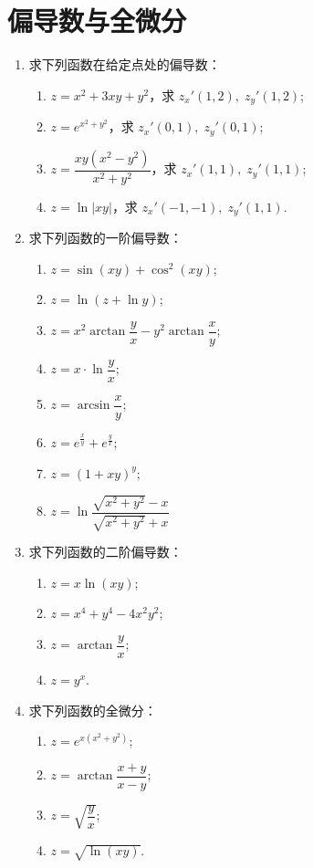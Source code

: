 \section{偏导数与全微分}

\begin{enumerate}\setlength{\itemsep}{7pt}
    \item 求下列函数在给定点处的偏导数：
    \begin{enumerate}[(1)]\setlength{\itemsep}{5pt}\setlength{\topsep}{15pt}
        \item $z=x^2+3xy+y^2$，求 $z_x'(1, 2),\;z_y'(1, 2)$;
        \item $z=e^{x^2+y^2}$，求 $z_x'(0, 1),\;z_y'(0, 1)$;
        \item $z=\dfrac{xy(x^2-y^2)}{x^2+y^2}$，求 $z_x'(1, 1),\;z_y'(1, 1)$;
        \item $z=\ln|xy|$，求 $z_x'(-1, -1),\;z_y'(1, 1)$.
    \end{enumerate}

    \item 求下列函数的一阶偏导数：
    \begin{enumerate}[(1)]\setlength{\itemsep}{5pt}\setlength{\topsep}{15pt}
        \item $z=\sin(xy)+\cos^2(xy)$;
        \item $z=\ln(z+\ln y)$;
        \item $z=x^2\arctan\dfrac{y}{x}-y^2\arctan\dfrac{x}{y}$;
        \item $z=x\cdot\ln\dfrac{y}{x}$;
        \item $z=\arcsin\dfrac{x}{y}$;
        \item $z=e^{\frac{x}{y}}+e^{\frac{y}{x}}$;
        \item $z=(1+xy)^{y}$;
        \item $z=\ln\dfrac{\sqrt{x^2+y^2}-x}{\sqrt{x^2+y^2}+x}$
    \end{enumerate}

    \item 求下列函数的二阶偏导数：
    \begin{enumerate}[(1)]\setlength{\itemsep}{5pt}\setlength{\topsep}{15pt}
        \item $z=x\ln(xy)$;
        \item $z=x^4+y^4-4x^2y^2$;
        \item $z=\arctan\dfrac{y}{x}$;
        \item $z=y^x$.
    \end{enumerate}

    \item 求下列函数的全微分：
    \begin{enumerate}[(1)]\setlength{\itemsep}{5pt}\setlength{\topsep}{15pt}
        \item $z=e^{x(x^2+y^2)}$;
        \item $z=\arctan\dfrac{x+y}{x-y}$;
        \item $z=\sqrt{\dfrac{y}{x}}$;
        \item $z=\sqrt{\ln(xy)}$.
    \end{enumerate}


\end{enumerate}

